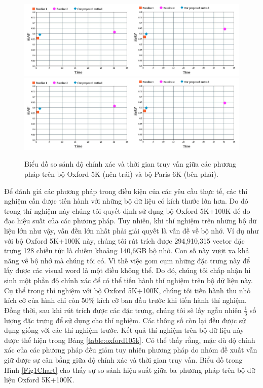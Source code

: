 \begin{figure}[!htbp]
  \begin{center}
    \leavevmode
    \ifpdf
      \includegraphics[scale=0.23]{2_charts}
    \else
      \includegraphics[scale=0.23]{2_charts}
    \fi
    \caption[Biểu đồ so sánh độ chính xác và thời gian truy vấn giữa các phương pháp]{Biểu đồ so sánh độ chính xác và thời gian truy vấn giữa các phương pháp trên bộ Oxford 5K (nên trái) và bộ Paris 6K (bên phải).}
    \label{Fig2Charts}
  \end{center}
\end{figure}

Để đánh giá các phương pháp trong điều kiện của các yêu cầu thực tế, các thí nghiệm cần được tiến hành với những bộ dữ liệu có kích thước lớn hơn. Do đó trong thí nghiệm này chúng tôi quyết định sử dụng bộ Oxford 5K+100K để đo đạc hiệu suất của các phương pháp. Tuy nhiên, khi thí nghiệm trên những bộ dữ liệu lớn như vậy, vấn đền lớn nhất phải giải quyết là vấn đề về bộ nhớ. Ví dụ như với bộ Oxford 5K+100K này, chúng tôi rút trích được 294,910,315 vector đặc trưng 128 chiều tức là chiếm khoảng 140,6GB bộ nhớ. Con số này vượt xa khả năng về bộ nhớ mà chúng tôi có. Vì thế việc gom cụm những đặc trưng này để lấy được các visual word là một điều không thể. Do đó, chúng tôi chấp nhận hi sinh một phần độ chính xác để có thể tiến hành thí nghiệm trên bộ dữ liệu này. Cụ thể trong thí nghiệm với bộ Oxford 5K+100K, chúng tôi tiến hành thu nhỏ kích cỡ của hình chỉ còn 50\% kích cỡ ban đầu trước khi tiến hành thí nghiệm. Đồng thời, sau khi rút trích được các đặc trưng, chúng tôi sẽ lấy ngẫu nhiên $\frac{1}{3}$ số lượng đặc trưng để sử dụng cho thí nghiệm. Các thông số còn lại đều được sử dụng giống với các thí nghiệm trước. Kết quả thí nghiệm trên bộ dữ liệu này được thể hiện trong Bảng \ref{table:oxford105k}. Có thể thấy rằng, mặc dù độ chính xác của các phương pháp đều giảm tuy nhiên phương pháp do nhóm đề xuất vẫn giữ được sự cân bằng giữa độ chính xác và thời gian truy vấn. Biểu đồ trong Hình \ref{Fig1Chart} cho thấy sự so sánh hiệu suất giữa ba phương pháp trên bộ dữ liệu Oxford 5K+100K.


